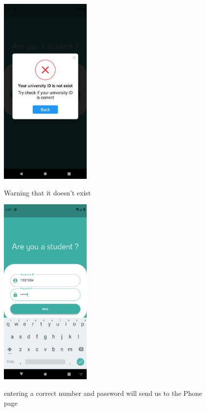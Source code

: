 \documentclass[12pt]{article}
\begin{document}
\begin{figure}[h!]
{\includegraphics[width=0.4\textwidth]{./Screenshots/4.PNG}}
  \caption{Warning that it doesn't exist}
\end{figure}



\begin{figure}[h!]
{\includegraphics[width=0.4\textwidth]{./Screenshots/5.PNG}}
  \caption{entering a correct number and password will send us to the Phone page}
\end{figure}
\end{document}
